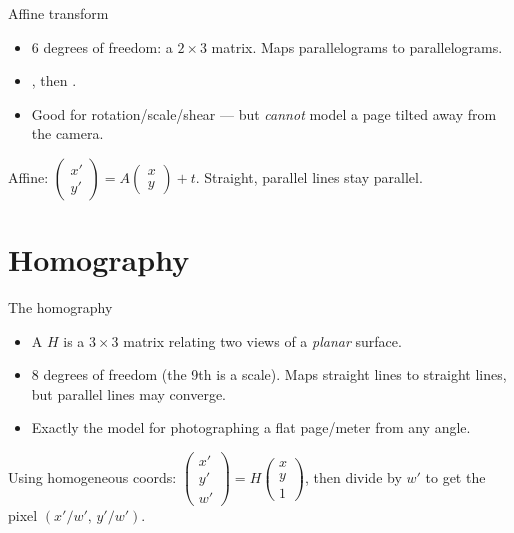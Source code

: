 \documentclass[10pt,aspectratio=169]{beamer}
\begin{document}
\begin{frame}{Affine transform}
  \begin{itemize}
    \item 6 degrees of freedom: a $2\times3$ matrix. Maps parallelograms to parallelograms.
    \item {}, then .
    \item Good for rotation/scale/shear — but \emph{cannot} model a page tilted away from the camera.
  \end{itemize}
  \begin{mathbox}
    Affine: $\begin{pmatrix}x'\\y'\end{pmatrix} = A\begin{pmatrix}x\\y\end{pmatrix} + t$. Straight, parallel lines stay parallel.
  \end{mathbox}
\end{frame}

\section{Homography}

\begin{frame}{The homography}
  \begin{itemize}
    \item A  $H$ is a $3\times3$ matrix relating two views of a \emph{planar} surface.
    \item 8 degrees of freedom (the 9th is a scale). Maps straight lines to straight lines, but
          parallel lines may converge.
    \item Exactly the model for photographing a flat page/meter from any angle.
  \end{itemize}
  \begin{mathbox}
    Using homogeneous coords: $\begin{pmatrix}x'\\y'\\w'\end{pmatrix} = H\begin{pmatrix}x\\y\\1\end{pmatrix}$,
    then divide by $w'$ to get the pixel $(x'/w',\,y'/w')$.
  \end{mathbox}
\end{frame}
\end{document}
